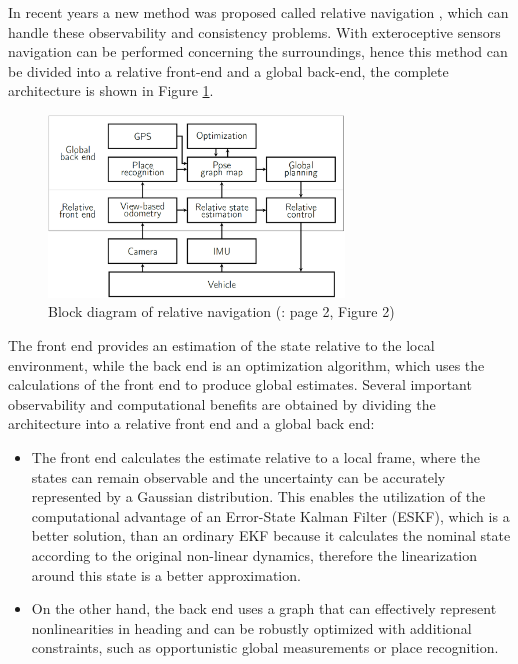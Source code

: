 In recent years a new method was proposed called relative navigation \cite{rel-nav-1, rel-nav-2}, which can handle these observability and consistency problems. With exteroceptive sensors navigation can be performed concerning the surroundings, hence this method can be divided into a relative front-end and a global back-end, the complete architecture is shown in Figure \ref{fig:real-nav}. 
\begin{figure}[!ht]
    \centering
    \includegraphics[width=0.7\textwidth]{figures/rel-nav}
    \caption{Block diagram of relative navigation (\cite{rel-nav}: page 2, Figure 2)}
    \label{fig:real-nav}
\end{figure}
The front end provides an estimation of the state relative to the local environment, while the back end is an optimization algorithm, which uses the calculations of the front end to produce global estimates. Several important observability and computational benefits are obtained by dividing the architecture into a relative front end and a global back end:
\begin{itemize}
    \item 
    The front end calculates the estimate relative to a local frame, where the states can remain observable and the uncertainty can be accurately represented by a Gaussian distribution. This enables the utilization of the computational advantage of an Error-State Kalman Filter (ESKF), which is a better solution, than an ordinary EKF because it calculates the nominal state according to the original non-linear dynamics, therefore the linearization around this state is a better approximation.
    
    \item 
     On the other hand, the back end uses a graph that can effectively represent nonlinearities in heading and can be robustly optimized with additional constraints, such as opportunistic global measurements or place recognition.
\end{itemize}

